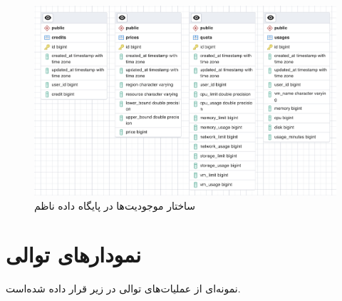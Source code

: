 \begin{figure}
	\centering
	\includegraphics[width=\linewidth]{figures/erd-nazem}
	\caption{ساختار موجودیت‌ها در پایگاه داده ناظم}
	\label{fig:erd-nazem}
\end{figure}

\section*{نمودار‌های توالی}

نمونه‌ای از عملیات‌های توالی در زیر قرار داده شده‌است.

